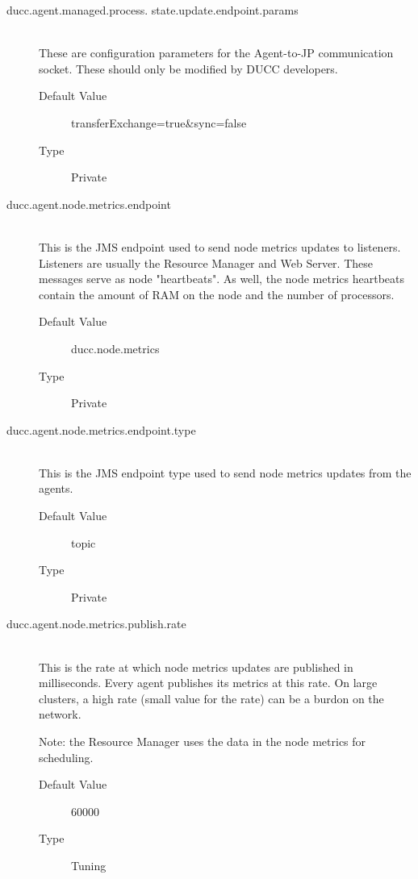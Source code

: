 \begin{description}
        \item[ducc.agent.managed.process. state.update.endpoint.params] \hfill \\
          These are configuration parameters for the Agent-to-JP communication socket. These 
          should only be modified by DUCC developers. 
          \begin{description}
            \item[Default Value] transferExchange=true\&sync=false 
            \item[Type] Private
          \end{description} 
          
        \item[ducc.agent.node.metrics.endpoint] \hfill \\
          This is the JMS endpoint used to send node metrics updates to listeners. Listeners 
          are usually the Resource Manager and Web Server. These messages serve as node 
          "heartbeats". As well, the node metrics heartbeats contain the amount of RAM on the node 
          and the number of processors. 
          \begin{description}
            \item[Default Value] ducc.node.metrics 
            \item[Type] Private 
          \end{description}
          
        \item[ducc.agent.node.metrics.endpoint.type] \hfill \\
          This is the JMS endpoint type used to send node metrics updates from the agents. 
          \begin{description}
            \item[Default Value] topic 
            \item[Type] Private 
          \end{description}
         
        \item[ducc.agent.node.metrics.publish.rate] \hfill \\
          This is the rate at which node metrics updates are published in milliseconds.   Every
          agent publishes its metrics at this rate.  On large clusters, a high rate (small 
          value for the rate) can be a burdon on the network.

          Note: the Resource Manager uses the data in the node metrics for scheduling.
          \begin{description}
            \item[Default Value] 60000 
            \item[Type] Tuning 
          \end{description}
          

\end{description}
